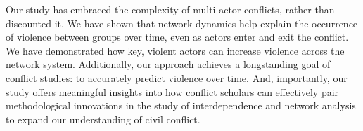 Our study has embraced the complexity of multi-actor conflicts, rather than discounted it. We have shown that network dynamics help explain the occurrence of violence between groups over time, even as actors enter and exit the conflict. We have demonstrated how key, violent actors can increase violence across the network system. Additionally, our approach achieves a longstanding goal of conflict studies: to accurately predict violence over time. And, importantly, our study offers meaningful insights into how conflict scholars can effectively pair methodological innovations in the study of interdependence and network analysis to expand our understanding of civil conflict.